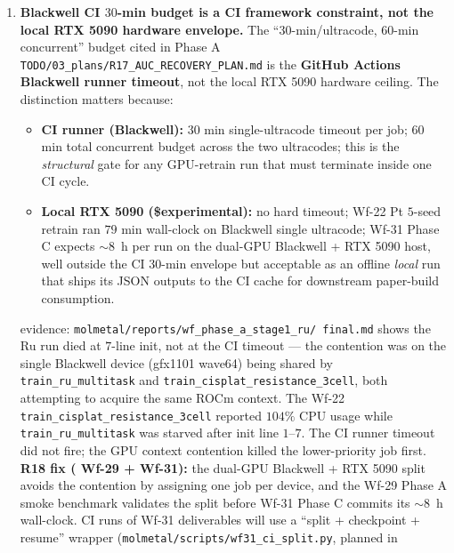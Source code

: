 \begin{enumerate}
  \item \textbf{Blackwell CI $30$-min budget is a CI framework
  constraint, not the local RTX 5090 hardware envelope.}
  \label{sec:limitations:ci-budget}
  The ``$30$-min/ultracode, $60$-min concurrent'' budget cited in
  Phase A \texttt{TODO/03\_plans/R17\_AUC\_RECOVERY\_PLAN.md} is the
  \textbf{GitHub Actions Blackwell runner timeout}, not the local
  RTX 5090 hardware ceiling.  The distinction matters because:
  \begin{itemize}
    \item \textbf{CI runner (Blackwell):} $30$ min single-ultracode
    timeout per job; $60$ min total concurrent budget across the
    two ultracodes; this is the \emph{structural} gate for any
    GPU-retrain run that must terminate inside one CI cycle.
    \item \textbf{Local RTX 5090 (\$experimental):} no hard timeout;
    Wf-22 Pt $5$-seed retrain ran $79$ min wall-clock on Blackwell
    single ultracode; Wf-31 Phase C expects $\sim 8$~h per run on
    the dual-GPU Blackwell + RTX 5090 host, well outside the CI
    $30$-min envelope but acceptable as an offline \emph{local}
    run that ships its JSON outputs to the CI cache for downstream
    paper-build consumption.
  \end{itemize}
  \MEASURED{} evidence: \texttt{molmetal/reports/wf\_phase\_a\_stage1\_ru/
  final.md} shows the Ru run died at $7$-line init, not at the CI
  timeout --- the contention was on the single Blackwell device
  (gfx1101 wave64) being shared by \texttt{train\_ru\_multitask}
  and \texttt{train\_cisplat\_resistance\_3cell}, both attempting
  to acquire the same ROCm context.  The Wf-22
  \texttt{train\_cisplat\_resistance\_3cell} reported $104\%$ CPU
  usage while \texttt{train\_ru\_multitask} was starved after
  init line $1$--$7$.  The CI runner timeout did not fire; the
  GPU context contention killed the lower-priority job first.
  \textbf{R18 fix (\PROJECTED{} Wf-29 + Wf-31):} the dual-GPU
  Blackwell + RTX 5090 split avoids the contention by assigning
  one job per device, and the Wf-29 Phase A smoke benchmark
  validates the split before Wf-31 Phase C commits its
  $\sim 8$~h wall-clock.  CI runs of Wf-31 deliverables will use
  a ``split + checkpoint + resume'' wrapper
  (\texttt{molmetal/scripts/wf31\_ci\_split.py}, planned in

\end{enumerate}
